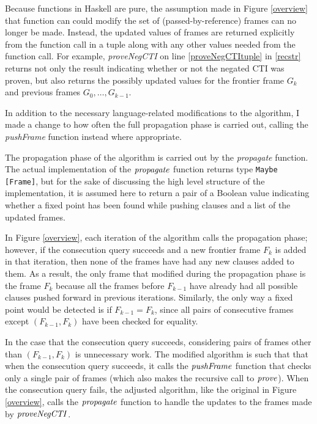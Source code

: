 \documentclass[12pt,a4paper,twoside,openright]{report}
\begin{document}
{Because functions in Haskell are pure, the assumption made in Figure \ref{overview}
that function can could modify the set of (passed-by-reference) frames can no longer be made.
Instead, the updated values of frames are returned explicitly from the function call in
a tuple along with any other values needed from the function call. For example,
{\it proveNegCTI} on line \ref{proveNegCTItuple} in \ref{recstr} returns not only the result
indicating whether or not the negated CTI was proven, but also returns the possibly updated
values for the frontier frame $G_k$ and previous frames $G_0, \ldots, G_{k - 1}$.

In addition to the necessary language-related modifications to the algorithm, I made a
change to how often the full propagation phase is carried out, calling the {\it pushFrame}
function instead where appropriate.

The propagation phase of the algorithm is carried out by the {\it propagate} function.
The actual implementation of the ${\it propagate}$ function returns type \verb,Maybe [Frame],,
but for the sake of discussing the high level structure of the implementation,
it is assumed here to return a pair of a Boolean value indicating whether a fixed point
has been found while pushing clauses and a list of the updated frames.

In Figure \ref{overview}, each iteration of the algorithm calls the propagation
phase; however, if the consecution query succeeds and a new frontier frame $F_k$
is added in that iteration, then none of the frames have had any new clauses
added to them. As a result, the only frame that modified during the propagation phase
is the frame $F_k$ because all the frames before $F_{k - 1}$ have already had all
possible clauses pushed forward in previous iterations.
Similarly, the only way a fixed point would be detected is if $F_{k - 1} = F_k$,
since all pairs of consecutive frames except $(F_{k - 1}, F_k)$ have been checked for
equality.

In the case that the consecution query succeeds, considering pairs of frames other
than $(F_{k - 1}, F_k)$ is unnecessary work. The modified algorithm is such that
that when the consecution query succeeds, it calls the ${\it pushFrame}$ function that
checks only a single pair of frames (which also makes the recursive call to ${\it prove}$).
When the consecution query fails, the adjusted algorithm, like the original in Figure \ref{overview},
calls the ${\it propagate}$ function to handle the updates to the frames made by ${\it proveNegCTI}$.

}
\end{document}
